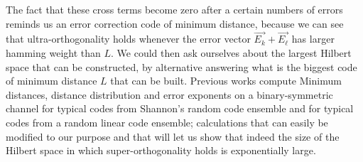 The fact that these cross terms become zero after a certain numbers of errors reminds us an error correction code of minimum distance, because we can see that ultra-orthogonality holds whenever the error vector $\vec{E_k}+\vec{E_\ell}$ has larger hamming weight than $L$. We could then ask ourselves about the largest Hilbert space that can be constructed, by alternative answering what is the biggest code of minimum distance $L$ that can be built. Previous works \cite{barg_random_2002} compute Minimum distances, distance distribution and error exponents on a binary-symmetric channel for typical codes from Shannon's random code ensemble and for typical codes from a random linear code ensemble; calculations that can easily be modified to our purpose and that will let us show that indeed the size of the Hilbert space in which super-orthogonality holds is exponentially large.\\











